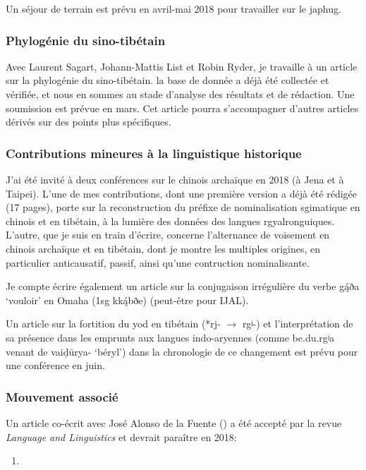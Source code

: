 \documentclass[oldfontcommands,oneside,a4paper,11pt]{article}
\newcommand{\ipa}[1]{{\phon #1}} %
\begin{document}
Un séjour de terrain est prévu en avril-mai 2018 pour travailler sur le japhug.

\subsubsection{Phylogénie du sino-tibétain} \label{sec:phylogenie.st}
Avec Laurent Sagart, Johann-Mattis List et Robin Ryder, je travaille à un article sur la phylogénie du sino-tibétain. la base de donnée a déjà été collectée et vérifiée, et nous en sommes au stade d'analyse des résultats et de rédaction. Une soumission est prévue en mars. Cet article pourra s'accompagner d'autres articles dérivés sur des points plus spécifiques.


\subsubsection{Contributions mineures à la linguistique historique}
J'ai été invité à deux conférences sur le chinois archaïque en 2018 (à Jena et à Taipei). L'une de mes contributions, dont une première version a déjà été rédigée (17 pages), porte sur la reconstruction du préfixe de nominalisation sgimatique en chinois et en tibétain, à la lumière des données des langues rgyalronguiques. L'autre, que je suis en train d'écrire, concerne l'alternance de voisement en chinois archaïque et en tibétain, dont je montre les multiples origines, en particulier anticausatif, passif, ainsi qu'une contruction nominalisante.


Je compte écrire également un article sur la conjugaison irrégulière du verbe \ipa{gą́ða}  `vouloir' en Omaha (1sg \ipa{kką́bðe}) (peut-être pour IJAL).

Un article sur la fortition du yod en tibétain (*\ipa{rj-} $\rightarrow$ \ipa{rgʲ-}) et l'interprétation de sa présence dans les emprunts aux langues indo-aryennes (comme \ipa{be.du.rgʲa} venant de \ipa{vaiḍūrya-} `béryl') dans la chronologie de ce changement est prévu pour une conférence en juin.

\subsubsection{Mouvement associé}
Un article co-écrit avec José Alonso de la Fuente (\citealt{fuente18am}) a été accepté par la revue \textit{Language and Linguistics} et devrait paraître en 2018:

\begin{enumerate}
  \item  {}
\end{enumerate}
\end{document}
